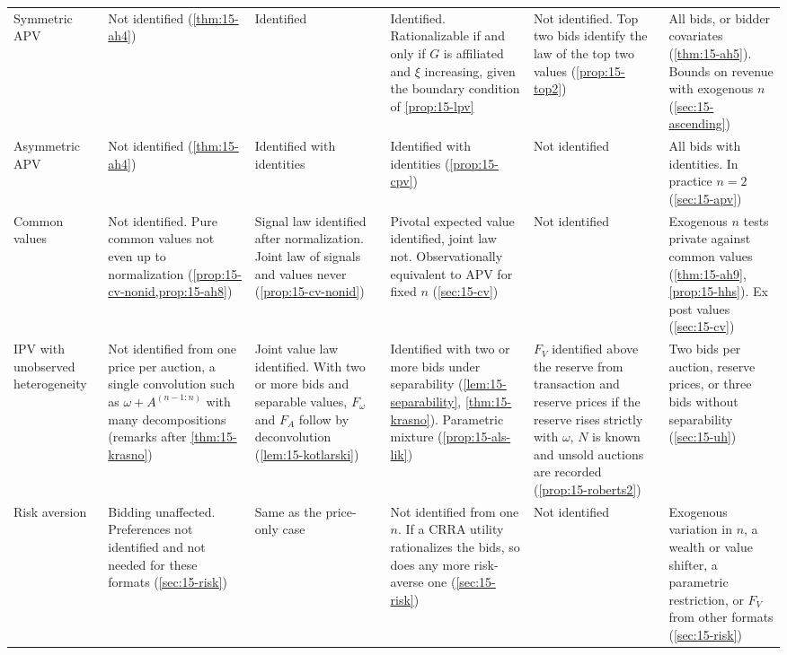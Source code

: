 \begin{table}[p]
{\begin{minipage}{\textheight}
\begin{tabularx}{\linewidth}{@{}>{\raggedright\arraybackslash}p{2.35cm}*{5}{>{\raggedright\arraybackslash}X}@{}}
\addlinespace[1pt]
Symmetric APV & Not identified (\cref{thm:15-ah4}) & Identified & Identified. Rationalizable if and only if $G$ is affiliated and $\xi$ increasing, given the boundary condition of \cref{prop:15-lpv} & Not identified. Top two bids identify the law of the top two values (\cref{prop:15-top2}) & All bids, or bidder covariates (\cref{thm:15-ah5}). Bounds on revenue with exogenous $n$ (\cref{sec:15-ascending})\\
\addlinespace[1pt]
Asymmetric APV & Not identified (\cref{thm:15-ah4}) & Identified with identities & Identified with identities (\cref{prop:15-cpv}) & Not identified & All bids with identities. In practice $n=2$ (\cref{sec:15-apv})\\
\addlinespace[1pt]
Common values & Not identified. Pure common values not even up to normalization (\cref{prop:15-cv-nonid,prop:15-ah8}) & Signal law identified after normalization. Joint law of signals and values never (\cref{prop:15-cv-nonid}) & Pivotal expected value identified, joint law not. Observationally equivalent to APV for fixed $n$ (\cref{sec:15-cv}) & Not identified & Exogenous $n$ tests private against common values (\cref{thm:15-ah9}, \cref{prop:15-hhs}). Ex post values (\cref{sec:15-cv})\\
\addlinespace[1pt]
IPV with unobserved heterogeneity & Not identified from one price per auction, a single convolution such as $\omega+A^{(n-1:n)}$ with many decompositions (remarks after \cref{thm:15-krasno}) & Joint value law identified. With two or more bids and separable values, $F_\omega$ and $F_A$ follow by deconvolution (\cref{lem:15-kotlarski}) & Identified with two or more bids under separability (\cref{lem:15-separability}, \cref{thm:15-krasno}). Parametric mixture (\cref{prop:15-als-lik}) & $F_V$ identified above the reserve from transaction and reserve prices if the reserve rises strictly with $\omega$, $N$ is known and unsold auctions are recorded (\cref{prop:15-roberts2}) & Two bids per auction, reserve prices, or three bids without separability (\cref{sec:15-uh})\\
\addlinespace[1pt]
Risk aversion & Bidding unaffected. Preferences not identified and not needed for these formats (\cref{sec:15-risk}) & Same as the price-only case & Not identified from one $n$. If a CRRA utility rationalizes the bids, so does any more risk-averse one (\cref{sec:15-risk}) & Not identified & Exogenous variation in $n$, a wealth or value shifter, a parametric restriction, or $F_V$ from other formats (\cref{sec:15-risk})\\

\end{tabularx}
\end{minipage}}
\end{table}
